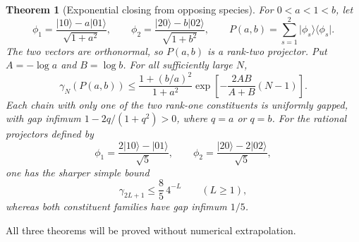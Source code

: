 \documentclass[11pt,a4paper]{article}
\newtheorem{theorem}{Theorem}[section]
\theoremstyle{remark}\newtheorem{remark}[theorem]{Remark}
\newcommand{\ket}[1]{\lvert #1\rangle}
\newcommand{\bra}[1]{\langle #1\rvert}
\begin{document}
\begin{theorem}[Exponential closing from opposing species]\label{thm:ranktwo-main}
For $0<a<1<b$, let
\begin{equation}\label{eq:ranktwo}
 \phi_1=\frac{\ket{10}-a\ket{01}}{\sqrt{1+a^2}},\qquad
 \phi_2=\frac{\ket{20}-b\ket{02}}{\sqrt{1+b^2}},\qquad
 P(a,b)=\sum_{s=1}^2\ket{\phi_s}\bra{\phi_s}.
\end{equation}
The two vectors are orthonormal, so $P(a,b)$ is a rank-two projector. Put
$A=-\log a$ and $B=\log b$. For all sufficiently large $N$,
\begin{equation}\label{eq:ranktwo-exp}
 \gamma_N(P(a,b))\le
 \frac{1+(b/a)^2}{1+a^2}
 \exp\left[-\frac{2AB}{A+B}(N-1)\right].
\end{equation}
Each chain with only one of the two rank-one constituents is uniformly gapped, with gap infimum $1-2q/(1+q^2)>0$, where $q=a$ or $q=b$.
For the rational projectors defined by
\begin{equation}\label{eq:rational-two}
 \phi_1=\frac{2\ket{10}-\ket{01}}{\sqrt5},\qquad
 \phi_2=\frac{\ket{20}-2\ket{02}}{\sqrt5},
\end{equation}
one has the sharper simple bound
\begin{equation}\label{eq:rational-exp}
 \gamma_{2L+1}\le\frac85\,4^{-L}\qquad(L\ge1),
\end{equation}
whereas both constituent families have gap infimum $1/5$.
\end{theorem}
All three theorems will be proved without numerical extrapolation.
\end{document}
